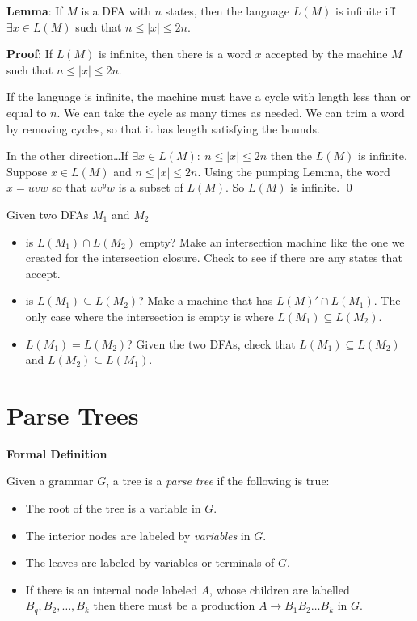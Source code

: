 \documentclass[12pt]{article}
\begin{document}
\textbf{Lemma}: If $M$ is a DFA with $n$ states, then the language $L(M)$ is
infinite iff $\exists x\in L(M)$ such that $n \le |x| \le 2n$.

\textbf{Proof}: If $L(M)$ is infinite, then there is a word $x$ accepted by the
machine $M$ such that $n \le |x| \le 2n$.

If the language is infinite, the machine must have a cycle with length less than
or equal to $n$. We can take the cycle as many times as needed. We can trim a
word by removing cycles, so that it has length satisfying the bounds.

In the other direction\dots If $\exists x \in L(M):\ n \le |x| \le 2n$ then the
$L(M)$ is infinite. Suppose $x \in L(M)$ and $n \le |x| \le 2n$. Using the
pumping Lemma, the word $x = uvw$ so that $uv^yw$ is a subset of $L(M)$. So
$L(M)$ is infinite. \qed

Given two DFAs $M_1$ and $M_2$ 
\begin{itemize}
	\item is $L(M_1) \cap L(M_2)$ empty? Make an intersection machine like the
		one we created for the intersection closure. Check to see if there are
		any states that accept.
	\item is $L(M_1) \subseteq L(M_2)$? Make a machine that has $L(M)'\cap
		L(M_1)$. The only case where the intersection is empty is where $L(M_1)
		\subseteq L(M_2)$.
	\item $L(M_1) = L(M_2)$? Given the two DFAs, check that $L(M_1) \subseteq
		L(M_2)$ and $L(M_2) \subseteq L(M_1)$.
\end{itemize}

\section{Parse Trees}

\textbf{Formal Definition}

Given a grammar $G$, a tree is a \emph{parse tree} if the following is true:
\begin{itemize}
	\item The root of the tree is a variable in $G$.
	\item The interior nodes are labeled by \emph{variables} in $G$.
	\item The leaves are labeled by variables or terminals of $G$.
	\item If there is an internal node labeled $A$, whose children are labelled
		$B_q,B_2,\dots,B_k$ then there must be a production $A \to B_1
		B_2\dots B_k$ in $G$.
\end{itemize}
\end{document}
